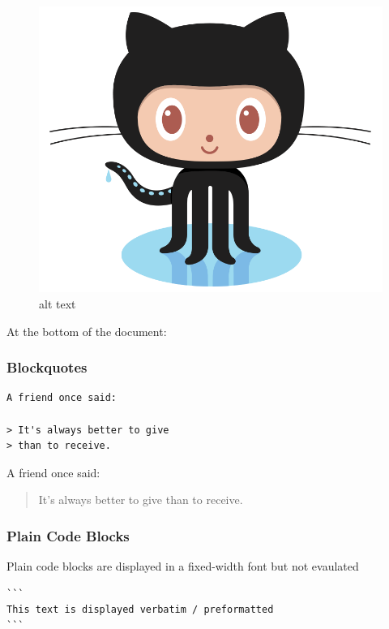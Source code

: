 \documentclass[]{book}
\theoremstyle{definition}
\theoremstyle{definition}
\theoremstyle{definition}
\theoremstyle{remark}
\begin{document}
\begin{figure}
\centering
\includegraphics{images/octocat.png}
\caption{alt text}
\end{figure}

At the bottom of the document:

\subsubsection{Blockquotes}\label{blockquotes}

\begin{verbatim}
A friend once said:

> It's always better to give
> than to receive.
\end{verbatim}

A friend once said:

\begin{quote}
It's always better to give than to receive.
\end{quote}

\subsubsection{Plain Code Blocks}\label{plain-code-blocks}

Plain code blocks are displayed in a fixed-width font but not evaulated

\begin{verbatim}
```
This text is displayed verbatim / preformatted
```
\end{verbatim}
\end{document}
